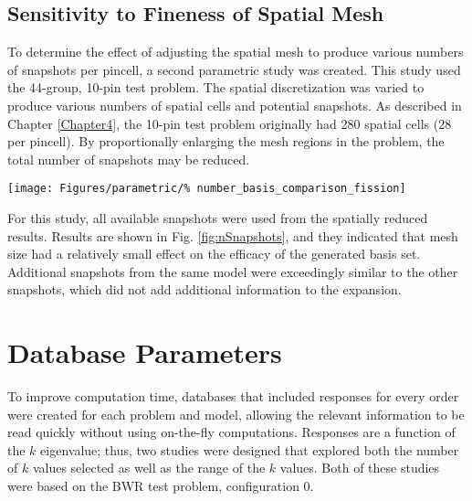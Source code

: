 \subsection{Sensitivity to Fineness of Spatial Mesh}

To determine the effect of adjusting the spatial mesh to produce various 
numbers of snapshots per pincell, a second parametric study was created.  
This study used the 44-group, 10-pin test problem.  The spatial 
discretization was varied to produce various numbers of spatial 
cells and potential snapshots. As described in Chapter \ref{Chapter4}, 
the 10-pin test problem originally had 280 spatial cells (28 per 
pincell).  By proportionally enlarging the mesh regions in the problem, 
the total number of snapshots may be reduced.  

\begin{figure*}[tb]
    \centering
    \texttt{[image: Figures/parametric/\%
        number\_basis\_comparison\_fission]}
    \caption{Relative error for 44-group, 10-pin test problem using 
        snapshots from a spatially reduced model.  The legend numbers 
correspond to the total number of available snapshots.  The problem was reduced 
from 280 total snapshots.}
\label{fig:nSnapshots}
\end{figure*}

For this study, all available snapshots were used from the spatially reduced 
results.  Results are shown in Fig. \ref{fig:nSnapshots}, and they
indicated that mesh size had a relatively 
small effect on the efficacy of the generated basis set.  Additional snapshots 
from the same model were exceedingly similar
to the other snapshots, which did not add additional information to the 
expansion.

\section{Database Parameters}

To improve computation time, databases that included responses for every order 
were created for each problem and model, allowing the relevant information to 
be read quickly without using on-the-fly computations.  Responses are a function 
of the $k$ eigenvalue; thus, two studies were designed that explored both the 
number of $k$ values selected as well as the range of the $k$ values.  Both of 
these studies were based on the BWR test problem, configuration 0.  

